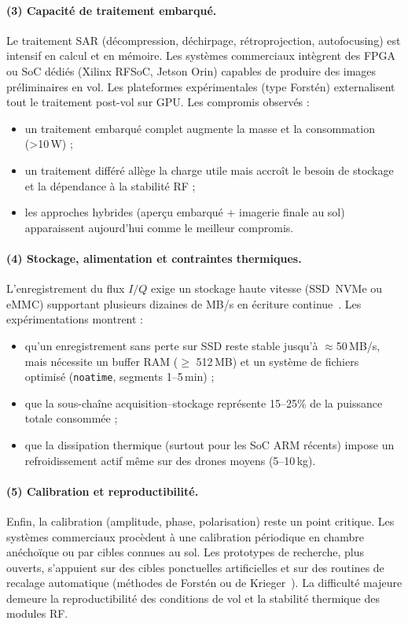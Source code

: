 \paragraph{(3) Capacité de traitement embarqué.}
Le traitement SAR (décompression, déchirpage, rétroprojection, autofocusing) est intensif en calcul et en mémoire.  
Les systèmes commerciaux intègrent des FPGA ou SoC dédiés (Xilinx RFSoC, Jetson Orin) capables de produire des images préliminaires en vol.  
Les plateformes expérimentales (type Forstén) externalisent tout le traitement post-vol sur GPU.  
Les compromis observés :
\begin{itemize}
  \item un traitement embarqué complet augmente la masse et la consommation (>10\,W) ;
  \item un traitement différé allège la charge utile mais accroît le besoin de stockage et la dépendance à la stabilité RF ;
  \item les approches hybrides (aperçu embarqué + imagerie finale au sol) apparaissent aujourd’hui comme le meilleur compromis.
\end{itemize}

\paragraph{(4) Stockage, alimentation et contraintes thermiques.}
L’enregistrement du flux $I/Q$ exige un stockage haute vitesse (SSD~NVMe ou eMMC) supportant plusieurs dizaines de MB/s en écriture continue~\cite{Balister2017_SigMF}.  
Les expérimentations montrent :
\begin{itemize}
  \item qu’un enregistrement sans perte sur SSD reste stable jusqu’à $\approx$50\,MB/s, mais nécessite un buffer RAM ($\geq$ 512\,MB) et un système de fichiers optimisé (\texttt{noatime}, segments 1–5\,min) ;
  \item que la sous-chaîne acquisition–stockage représente 15–25\% de la puissance totale consommée ;
  \item que la dissipation thermique (surtout pour les SoC ARM récents) impose un refroidissement actif même sur des drones moyens (5–10\,kg).
\end{itemize}

\paragraph{(5) Calibration et reproductibilité.}
Enfin, la calibration (amplitude, phase, polarisation) reste un point critique.  
Les systèmes commerciaux procèdent à une calibration périodique en chambre anéchoïque ou par cibles connues au sol.  
Les prototypes de recherche, plus ouverts, s’appuient sur des cibles ponctuelles artificielles et sur des routines de recalage automatique (méthodes de Forstén ou de Krieger~\cite{Forsten2025,Krieger2010_InterferometricSAR}).  
La difficulté majeure demeure la reproductibilité des conditions de vol et la stabilité thermique des modules RF.

